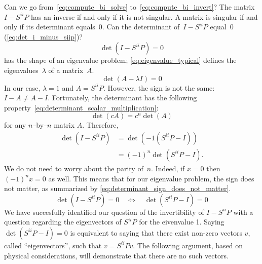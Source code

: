 Can we go from~\cref{eq:compute_bi_solve} to~\cref{eq:compute_bi_invert}?
The matrix~$I - S^{ii}P$ has an inverse if and only if it is not singular.
A matrix is singular if and only if its determinant equals~0.
Can the determinant of~$I - S^{ii}P$ equal~0 (\cref{eq:det_i_minus_siip})?
\begin{equation}
    \det(I - S^{ii}P) = 0 \label{eq:det_i_minus_siip}
\end{equation}
 has the shape of an eigenvalue problem;
\cref{eq:eigenvalue_typical} defines the eigenvalues~$\lambda$ of a matrix~$A$.
\begin{equation}
    \det(A - \lambda I) = 0 \label{eq:eigenvalue_typical}
\end{equation}
In our case, $\lambda=1$ and $A=S^{ii}P$.
However, the sign is not the same: $I-A \neq A-I$.
Fortunately, the determinant has the following property~\cref{eq:determinant_scalar_multiplication}:
\begin{equation}
    \det(c A) = c^n \det(A) \label{eq:determinant_scalar_multiplication}
\end{equation}
for any $n$--by--$n$ matrix $A$.
Therefore,
\begin{subequations}
    \begin{align}
        \det(I - S^{ii}P)
        &= \det(-1(S^{ii}P - I)) \\
        &= (-1)^n \det(S^{ii}P - I) \text{.}
    \end{align}
\end{subequations}
We do not need to worry about the parity of~$n$.
Indeed, if $x=0$ then $(-1)^n x = 0$ as well.
This means that for our eigenvalue problem, the sign does not matter, as summarized by \cref{eq:determinant_sign_does_not_matter}.
\begin{equation}
    \det(I - S^{ii}P) = 0
    \quad
    \Longleftrightarrow
    \quad
    \det(S^{ii}P - I) = 0
    \label{eq:determinant_sign_does_not_matter}
\end{equation}
We have succesfully identified our question of the invertibility of $I - S^{ii}P$ with a question regarding the eigenvectors of $S^{ii}P$ for the eivenvalue 1.
Saying $\det(S^{ii}P - I) = 0$ is equivalent to saying that there exist non-zero vectors $v$, called ``eigenvectors'', such that $v = S^{ii}Pv$.
The following argument, based on physical considerations, will demonstrate that there are no such vectors.

